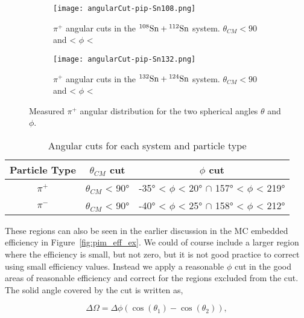 \begin{figure}[!htb]
     \centering
     \begin{subfigure}[b]{0.49\textwidth}
         \centering
         \texttt{[image: angularCut-pip-Sn108.png]}
         \caption{$\pi^+$ angular cuts in the ${}^{108}\mathrm{Sn} + {}^{112}\mathrm{Sn}$ system. $\theta_{CM} < 90$ and < $\phi$ <}
         \label{fig:pip108angle}
     \end{subfigure}
     \hfill
     \begin{subfigure}[b]{0.49\textwidth}
         \centering
         \texttt{[image: angularCut-pip-Sn132.png]}
         \caption{$\pi^+$ angular cuts in the ${}^{132}\mathrm{Sn} + {}^{124}\mathrm{Sn}$ system. $\theta_{CM} < 90$ and < $\phi$ <}
         \label{fig:pip132angle}
     \end{subfigure}
        \caption{Measured $\pi^+$ angular distribution for the two spherical angles $\theta$ and $\phi$.}
        \label{fig:pip}
\end{figure}



 \begin{table*}[!htb]
 \centering
{}
\begin{tabular}{@{}ccc@{}}\toprule 
Particle Type & $\theta_{CM}$ cut & $\phi$ cut  \\ [0.5ex] 
 \midrule
$\pi^+$  & $\theta_{CM}$ < \ang{90}   &  \ang{-35} < $\phi$ < \ang{20} $\cap$ \ang{157} < $\phi$ < \ang{219}  \\
$\pi^-$  & $\theta_{CM}$ < \ang{90}   &  \ang{-40} < $\phi$ < \ang{25} $\cap$ \ang{158} < $\phi$ < \ang{212}   \\
 \bottomrule
\end{tabular}
\caption{Angular cuts for each system and particle type}
\label{tb:anglecuts}
\end{table*}



These regions can also be seen in the earlier discussion in the MC embedded efficiency in Figure~\ref{fig:pim_eff_ex}.  We could of course include a larger region where the efficiency is small, but not zero, but it is not good practice to  correct using small efficiency values. Instead we apply a reasonable $\phi$ cut in the good areas of reasonable efficiency and correct for the regions excluded from the cut. The solid angle covered by the cut is written as,

\begin{equation}
\Delta\Omega = \Delta\phi(\cos(\theta_1) - \cos(\theta_2)),
\end{equation}

